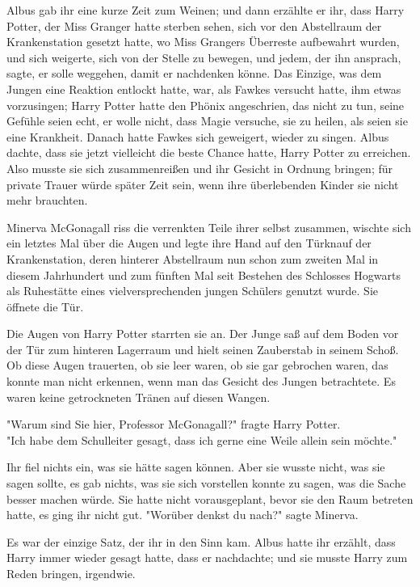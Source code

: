 {Albus gab ihr eine kurze Zeit zum Weinen; und dann erzählte er ihr, dass Harry Potter, der Miss Granger hatte sterben sehen, sich vor den Abstellraum der Krankenstation gesetzt hatte, wo Miss Grangers Überreste aufbewahrt wurden, und sich weigerte, sich von der Stelle zu bewegen, und jedem, der ihn ansprach, sagte, er solle weggehen, damit er nachdenken könne. Das Einzige, was dem Jungen eine Reaktion entlockt hatte, war, als Fawkes versucht hatte, ihm etwas vorzusingen; Harry Potter hatte den Phönix angeschrien, das nicht zu tun, seine Gefühle seien echt, er wolle nicht, dass Magie versuche, sie zu heilen, als seien sie eine Krankheit. Danach hatte Fawkes sich geweigert, wieder zu singen. Albus dachte, dass sie jetzt vielleicht die beste Chance hatte, Harry Potter zu erreichen. Also musste sie sich zusammenreißen und ihr Gesicht in Ordnung bringen; für private Trauer würde später Zeit sein, wenn ihre überlebenden Kinder sie nicht mehr brauchten.

Minerva McGonagall riss die verrenkten Teile ihrer selbst zusammen, wischte sich ein letztes Mal über die Augen und legte ihre Hand auf den Türknauf der Krankenstation, deren hinterer Abstellraum nun schon zum zweiten Mal in diesem Jahrhundert und zum fünften Mal seit Bestehen des Schlosses Hogwarts als Ruhestätte eines vielversprechenden jungen Schülers genutzt wurde. Sie öffnete die Tür.

Die Augen von Harry Potter starrten sie an. Der Junge saß auf dem Boden vor der Tür zum hinteren Lagerraum und hielt seinen Zauberstab in seinem Schoß. Ob diese Augen trauerten, ob sie leer waren, ob sie gar gebrochen waren, das konnte man nicht erkennen, wenn man das Gesicht des Jungen betrachtete. Es waren keine getrockneten Tränen auf diesen Wangen.

"Warum sind Sie hier, Professor McGonagall?" fragte Harry Potter.\\ "Ich habe dem Schulleiter gesagt, dass ich gerne eine Weile allein sein möchte."

Ihr fiel nichts ein, was sie hätte sagen können. Aber sie wusste nicht, was sie sagen sollte, es gab nichts, was sie sich vorstellen konnte zu sagen, was die Sache besser machen würde. Sie hatte nicht vorausgeplant, bevor sie den Raum betreten hatte, es ging ihr nicht gut. "Worüber denkst du nach?" sagte Minerva.

Es war der einzige Satz, der ihr in den Sinn kam. Albus hatte ihr erzählt, dass Harry immer wieder gesagt hatte, dass er nachdachte; und sie musste Harry zum Reden bringen, irgendwie.

}
